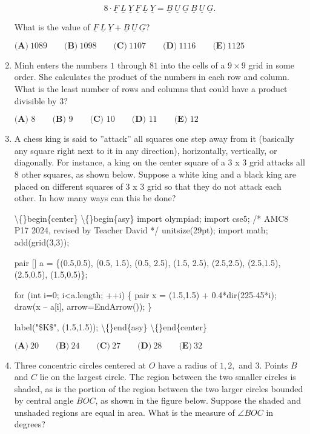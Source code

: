 \documentclass{article}
\begin{document}
\begin{enumerate}[label=\arabic*., itemsep=0.5em]
\begin{equation*}
8\cdot\underline{F}~\underline{L}~\underline{Y}~\underline{F}~\underline{L}~\underline{Y}=\underline{B}~\underline{U}~\underline{G}~\underline{B}~\underline{U}~\underline{G}.
\end{equation*}


What is the value of \(\underline{F}~\underline{L}~\underline{Y}+\underline{B}~\underline{U}~\underline{G}\)?

\(\textbf{(A)}\ 1089 \qquad \textbf{(B)}\ 1098 \qquad \textbf{(C)}\ 1107 \qquad \textbf{(D)}\ 1116 \qquad \textbf{(E)}\ 1125\)\par \vspace{0.5em}\item Minh enters the numbers \(1\) through \(81\) into the cells of a \(9 \times 9\) grid in some order. She calculates the product of the numbers in each row and column. What is the least number of rows and columns that could have a product divisible by \(3\)?

\(\textbf{(A) } 8\qquad\textbf{(B) } 9\qquad\textbf{(C) } 10\qquad\textbf{(D) } 11\qquad\textbf{(E) } 12\)\par \vspace{0.5em}\item A chess king is said to ''attack'' all squares one step away from it (basically any square right next to it in any direction), horizontally, vertically, or diagonally. For instance, a king on the center square of a 3 x 3 grid attacks all 8 other squares, as shown below. Suppose a white king and a black king are placed on different squares of 3 x 3 grid so that they do not attack each other. In how many ways can this be done?


\textbackslash\{\}begin\{center\}
\textbackslash\{\}begin\{asy\}
import olympiad;
import cse5;
/* AMC8 P17 2024, revised by Teacher David */
unitsize(29pt);
import math;
add(grid(3,3));

pair [] a = \{(0.5,0.5), (0.5, 1.5), (0.5, 2.5), (1.5, 2.5), (2.5,2.5), (2.5,1.5), (2.5,0.5), (1.5,0.5)\};

for (int i=0; i<a.length; ++i) \{
    pair x = (1.5,1.5) + 0.4*dir(225-45*i);
    draw(x -- a[i], arrow=EndArrow());
\}

label("\$K\$", (1.5,1.5));
\textbackslash\{\}end\{asy\}
\textbackslash\{\}end\{center\}


\(\textbf{(A)}\ 20 \qquad \textbf{(B)}\ 24 \qquad \textbf{(C)}\ 27 \qquad \textbf{(D)}\ 28 \qquad \textbf{(E)}\ 32\)\par \vspace{0.5em}\item Three concentric circles centered at \(O\) have a radius of \(1,2,\) and \(3\). Points \(B\) and \(C\) lie on the largest circle. The region between the two smaller circles is shaded, as is the portion of the region between the two larger circles bounded by central angle \(BOC\), as shown in the figure below. Suppose the shaded and unshaded regions are equal in area. What is the measure of \(\angle{BOC}\) in degrees?



\end{enumerate}
\end{document}
